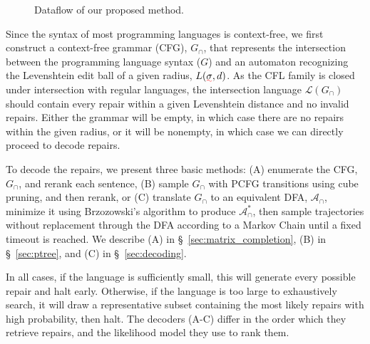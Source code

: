 \documentclass[sigplan,review,acmsmall,nonacm,anonymous]{acmart}\settopmatter{printfolios=false,printccs=false,printacmref=false}
\begin{document}
\begin{figure}
\begin{center}
{\begin{tikzpicture}[node distance=2cm]
        \end{tikzpicture}
      }
    \end{center}
    \caption{Dataflow of our proposed method.}\label{fig:flowchart}
    \vspace{-0.5cm}
  \end{figure}

  Since the syntax of most programming languages is context-free, we first construct a context-free grammar (CFG), $G_\cap$, that represents the intersection between the programming language syntax ($G$) and an automaton recognizing the Levenshtein edit ball of a given radius, $L(\err\sigma, d)$. As the CFL family is closed under intersection with regular languages, the intersection language $\mathcal{L}(G_\cap)$ should contain every repair within a given Levenshtein distance and no invalid repairs. Either the grammar will be empty, in which case there are no repairs within the given radius, or it will be nonempty, in which case we can directly proceed to decode repairs.


  To decode the repairs, we present three basic methods: (A) enumerate the CFG, $G_\cap$, and rerank each sentence, (B) sample $G_\cap$ with PCFG transitions using cube pruning, and then rerank, or (C) translate $G_\cap$ to an equivalent DFA, $\mathcal{A}_\cap$, minimize it using Brzozowski's algorithm to produce $\mathcal{A}_\cap^*$, then sample trajectories without replacement through the DFA according to a Markov Chain until a fixed timeout is reached. We describe (A) in \S~\ref{sec:matrix_completion}, (B) in \S~\ref{sec:ptree}, and (C) in \S~\ref{sec:decoding}.

  In all cases, if the language is sufficiently small, this will generate every possible repair and halt early. Otherwise, if the language is too large to exhaustively search, it will draw a representative subset containing the most likely repairs with high probability, then halt. The decoders (A-C) differ in the order which they retrieve repairs, and the likelihood model they use to rank them.
\end{document}
